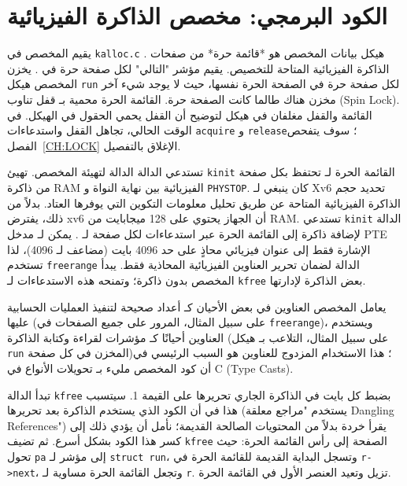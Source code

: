 \section{الكود البرمجي: مخصص الذاكرة الفيزيائية}
\label{sec:code_physical_memory_allocator}

يقيم المخصص في {\tt kalloc.c} .
هيكل بيانات المخصص هو *قائمة حرة* من صفحات الذاكرة الفيزيائية المتاحة للتخصيص.
يقيم مؤشر "التالي" لكل صفحة حرة في .
يخزن المخصص هيكل \lstinline{run} لكل صفحة حرة في الصفحة الحرة نفسها،
حيث لا يوجد شيء آخر مخزن هناك طالما كانت الصفحة حرة.
القائمة الحرة محمية بـ قفل تناوب (Spin Lock).
القائمة والقفل مغلفان في هيكل لتوضيح أن القفل يحمي الحقول في الهيكل.
في الوقت الحالي، تجاهل القفل واستدعاءات \lstinline{acquire} و \lstinline{release}؛
سوف يتفحص الفصل~\ref{CH:LOCK} الإغلاق بالتفصيل.

تستدعي الدالة  الدالة  لتهيئة المخصص.
تهيئ \lstinline{kinit} القائمة الحرة لـ تحتفظ بكل صفحة من ذاكرة RAM الفيزيائية بين نهاية النواة و {\tt PHYSTOP}.
كان ينبغي لـ Xv6 تحديد حجم الذاكرة الفيزيائية المتاحة عن طريق تحليل معلومات التكوين التي يوفرها العتاد.
بدلاً من ذلك، يفترض xv6 أن الجهاز يحتوي على 128 ميجابايت من RAM.
تستدعي \lstinline{kinit} الدالة  لإضافة ذاكرة إلى القائمة الحرة عبر استدعاءات لكل صفحة لـ .
يمكن لـ مدخل PTE الإشارة فقط إلى عنوان فيزيائي محاذٍ على حد 4096 بايت (مضاعف لـ 4096)،
لذا تستخدم \lstinline{freerange} الدالة  لضمان تحرير العناوين الفيزيائية المحاذية فقط.
يبدأ المخصص بدون ذاكرة؛ وتمنحه هذه الاستدعاءات لـ \lstinline{kfree} بعض الذاكرة لإدارتها.

يعامل المخصص العناوين في بعض الأحيان كـ أعداد صحيحة لتنفيذ العمليات الحسابية عليها (على سبيل المثال، المرور على جميع الصفحات في \lstinline{freerange})،
ويستخدم العناوين أحيانًا كـ مؤشرات لقراءة وكتابة الذاكرة (على سبيل المثال، التلاعب بـ هيكل \lstinline{run} المخزن في كل صفحة)؛
هذا الاستخدام المزدوج للعناوين هو السبب الرئيسي في أن كود المخصص مليء بـ تحويلات الأنواع في C (Type Casts).

تبدأ الدالة \lstinline{kfree} بضبط كل بايت في الذاكرة الجاري تحريرها على القيمة 1.
سيتسبب هذا في أن الكود الذي يستخدم الذاكرة بعد تحريرها (يستخدم "مراجع معلقة Dangling References") يقرأ خردة بدلاً من المحتويات الصالحة القديمة؛
نأمل أن يؤدي ذلك إلى كسر هذا الكود بشكل أسرع.
ثم تضيف \lstinline{kfree} الصفحة إلى رأس القائمة الحرة:
حيث تحول \lstinline{pa} إلى مؤشر لـ \lstinline{struct run}،
وتسجل البداية القديمة للقائمة الحرة في \lstinline{r->next}،
وتجعل القائمة الحرة مساوية لـ \lstinline{r}.
تزيل  وتعيد العنصر الأول في القائمة الحرة.

